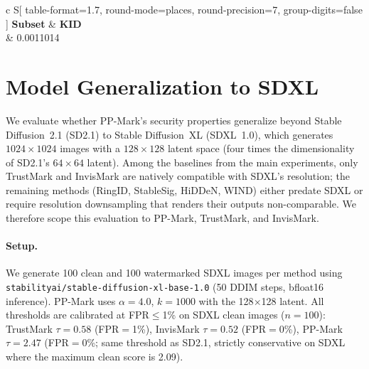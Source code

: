 \documentclass{article}
\theoremstyle{plain}
\theoremstyle{definition}
\theoremstyle{remark}
\begin{document}
\newpage

\begin{table}[H]
    \caption{KID for generation distributional fidelity (subset=500, splits=20).}
    \label{tab:kid-500}
    \begin{center}
      \begin{small}
        \begin{sc}
          \begin{tabular}{
          c
          S[
            table-format=1.7,
            round-mode=places,
            round-precision=7,
            group-digits=false
          ]
          }
            \toprule
            \textbf{Subset} & {\textbf{KID}} \\
             & 0.0011014 \\
            \bottomrule
          \end{tabular}
        \end{sc}
      \end{small}
    \end{center}
    \vskip -0.1in
\end{table}

\section{Model Generalization to SDXL}\label{app:sdxl}

We evaluate whether PP-Mark's security properties generalize beyond Stable Diffusion~2.1 (SD2.1) to Stable Diffusion~XL (SDXL~1.0), which generates $1024{\times}1024$ images with a $128{\times}128$ latent space (four times the dimensionality of SD2.1's $64{\times}64$ latent). Among the baselines from the main experiments, only TrustMark and InvisMark are natively compatible with SDXL's resolution; the remaining methods (RingID, StableSig, HiDDeN, WIND) either predate SDXL or require resolution downsampling that renders their outputs non-comparable. We therefore scope this evaluation to PP-Mark, TrustMark, and InvisMark.

\paragraph{Setup.}
We generate 100 clean and 100 watermarked SDXL images per method using \texttt{stabilityai/stable-diffusion-xl-base-1.0} (50 DDIM steps, bfloat16 inference). PP-Mark uses $\alpha{=}4.0$, $k{=}1000$ with the 128${\times}$128 latent. All thresholds are calibrated at FPR${\leq}$1\% on SDXL clean images ($n{=}100$): TrustMark $\tau{=}0.58$ (FPR$=$1\%), InvisMark $\tau{=}0.52$ (FPR$=$0\%), PP-Mark $\tau{=}2.47$ (FPR$=$0\%; same threshold as SD2.1, strictly conservative on SDXL where the maximum clean score is 2.09).
\end{document}
